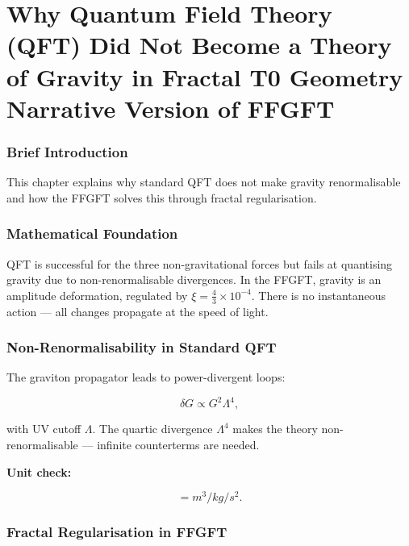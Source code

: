 \chapter{Why Quantum Field Theory (QFT) Did Not Become a Theory of Gravity in Fractal T0 Geometry  Narrative Version of FFGFT}


	
	\subsection*{Brief Introduction}
	
	This chapter explains why standard QFT does not make gravity renormalisable and how the FFGFT solves this through fractal regularisation.
	
	\subsection*{Mathematical Foundation}
	
	QFT is successful for the three non-gravitational forces but fails at quantising gravity due to non-renormalisable divergences. In the FFGFT, gravity is an amplitude deformation, regulated by \(\xi = \frac{4}{3} \times 10^{-4}\). There is no instantaneous action — all changes propagate at the speed of light.
	
	\subsection*{Non-Renormalisability in Standard QFT}
	
	The graviton propagator leads to power-divergent loops:
	
	\begin{equation}
		\delta G \propto G^2 \Lambda^4,
	\end{equation}
	
	with UV cutoff \(\Lambda\). The quartic divergence \(\Lambda^4\) makes the theory non-renormalisable — infinite counterterms are needed.
	
	\textbf{Unit check:}
	
	\begin{equation}
		[\delta G] = \si{m^{3}/kg/s^{2}}.
	\end{equation}
	
	\subsection*{Fractal Regularisation in FFGFT}
	
